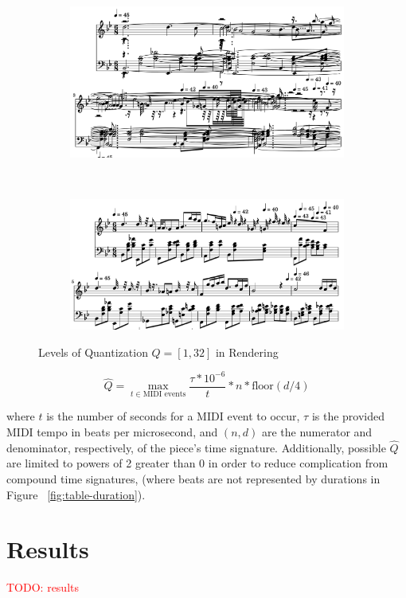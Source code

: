 \documentclass[review,sigconf]{acmart}
\newcommand{\todo}[1]{\textcolor{red}{TODO: #1}}
\begin{document}
\begin{figure}
	\centering
	\begin{subfigure}
		\centering
		\includegraphics[width = .8\linewidth]{./figures/c1.png}
	\end{subfigure}
	~
	\begin{subfigure}
		\centering
		\includegraphics[width = .8\linewidth]{./figures/c32.png}
	\end{subfigure}
	\caption{Levels of Quantization $Q = [1, 32]$ in Rendering}
	\label{fig:quantization}
\end{figure}

\begin{equation}
	\hat Q = \max_{t\in \text{MIDI events}} \frac{\tau * 10^{-6}}{t} * n * \text{floor}(d / 4)
\end{equation}

where $t$ is the number of seconds for a MIDI event to occur, $\tau$ is the provided MIDI tempo in beats per microsecond, and $(n, d)$ are the numerator and denominator, respectively, of the piece's time signature.
Additionally, possible $\hat Q$ are limited to powers of 2 greater than 0 in order to reduce complication from compound time signatures, (where beats are not represented by durations in Figure ~\ref{fig:table-duration}).


\section{Results}
\todo{results}
\end{document}
